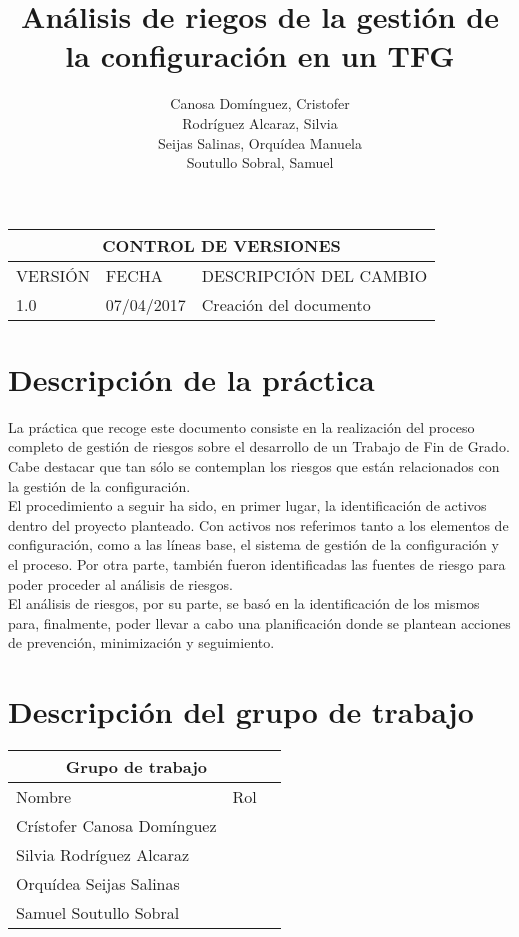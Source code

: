 \documentclass[10pt,a4paper]{article}
\author{Canosa Domínguez, Cristofer \\ Rodríguez Alcaraz, Silvia \\ Seijas Salinas, Orquídea Manuela \\ Soutullo Sobral, Samuel}
\title{Análisis de riegos de la gestión de la configuración en un TFG}
\begin{document}
	\maketitle %
	\newpage
		
	\begin{table}[htb]
    \centering
    \begin{tabular}{|l|l|l|}
    \hline
    \multicolumn{3}{|c|}{CONTROL DE VERSIONES} \\ \hline
    VERSIÓN & FECHA & DESCRIPCIÓN DEL CAMBIO\\
    \hline \hline
    1.0 & 07/04/2017 & Creación del documento \\ \hline
    \end{tabular}   
    \end{table}
    	
	\newpage
	\tableofcontents
	\newpage
	
	\section{Descripción de la práctica}
	La práctica que recoge este documento consiste en la realización del proceso completo de gestión de riesgos sobre el desarrollo de un Trabajo de Fin de Grado. Cabe destacar que tan sólo se contemplan los riesgos que están relacionados con la gestión de la configuración.\\
	
	El procedimiento a seguir ha sido, en primer lugar, la identificación de activos dentro del proyecto planteado. Con activos nos referimos tanto a los elementos de configuración, como a las líneas base, el sistema de gestión de la configuración y el proceso. Por otra parte, también fueron identificadas las fuentes de riesgo para poder proceder al análisis de riesgos.\\
	
	El análisis de riesgos, por su parte, se basó en la identificación de los mismos para, finalmente, poder llevar a cabo una planificación donde se plantean acciones de prevención, minimización y seguimiento.
		
	\section{Descripción del grupo de trabajo}
		\begin{table}[htb]
        \centering
        \begin{tabular}{|l|l|l|}
        \hline
        \multicolumn{2}{|c|}{Grupo de trabajo} \\ \hline
        Nombre & Rol\\
        \hline \hline
        Crístofer Canosa Domínguez &  \\ \hline
        Silvia Rodríguez Alcaraz & \\ \hline
        Orquídea Seijas Salinas & \\ \hline
        Samuel Soutullo Sobral & \\ \hline
        \end{tabular}   
        \end{table}
		
\end{document}
